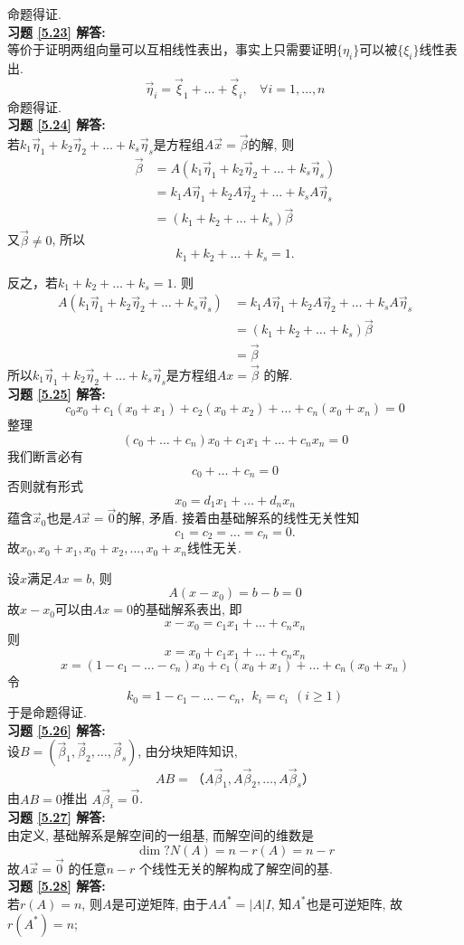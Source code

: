 \documentclass[a4paper]{book}
\begin{document}
命题得证.\\
\textbf{习题 \ref{5.23} 解答:}\\
等价于证明两组向量可以互相线性表出，事实上只需要证明$\{\eta_i \}$可以被$\{\xi_i \}$线性表出.
$$\vec{\eta}_i=\vec{\xi}_1+\dots+\vec{\xi}_i,\ \ \ \   \forall i=1,\dots,n$$
命题得证.\\
\textbf{习题 \ref{5.24} 解答:}\\
若$k_1 \vec{\eta}_1+k_2 \vec{\eta}_2+\dots+k_s  \vec{\eta}_s$是方程组$A\vec{x}=\vec{\beta}$的解, 则
\begin{displaymath}\begin{aligned}
\vec{\beta}&=A(k_1 \vec{\eta}_1+k_2 \vec{\eta}_2+\dots+k_s \vec{\eta}_s )\\&=k_1 A\vec{\eta}_1+k_2 A\vec{\eta}_2+\dots+k_s A\vec{\eta}_s\\&=(k_1+k_2+\dots+k_s )\vec{\beta}
\end{aligned}
\end{displaymath}
又$\vec{\beta}\not=0$, 所以$$k_1+k_2+\dots+k_s=1.$$

反之，若$k_1+k_2+\dots+k_s=1.$ 则
\begin{displaymath}\begin{aligned}
A(k_1 \vec{\eta}_1+k_2 \vec{\eta}_2+\dots+k_s \vec{\eta}_s )&=k_1 A\vec{\eta}_1+k_2 A\vec{\eta}_2+\dots+k_s A\vec{\eta}_s\\&=(k_1+k_2+\dots+k_s )\vec{\beta}\\&=\vec{\beta}
\end{aligned}
\end{displaymath}
所以$k_1 \vec{\eta}_1+k_2 \vec{\eta}_2+\dots+k_s \vec{\eta}_s$是方程组$Ax=\vec{\beta}$ 的解.\\
\textbf{习题 \ref{5.25} 解答:}\\
$$c_0 x_0+c_1 (x_0+x_1 )+c_2 (x_0+x_2 )+\dots+c_n (x_0+x_n )=0$$
整理
$$(c_0+\dots+c_n) x_0+c_1 x_1+\dots+c_n x_n=0$$
我们断言必有$$c_0+\dots+c_n=0$$
否则就有形式$$x_0=d_1 x_1+\dots+d_n x_n$$
蕴含$\vec{x}_0$也是$A\vec{x}=\vec{0}$的解, 矛盾. 接着由基础解系的线性无关性知$$c_1=c_2=\dots=c_n=0.$$
故$x_0,x_0+x_1,x_0+x_2,\dots,x_0+x_n$线性无关.

设$x$满足$Ax=b$, 则$$A(x-x_0)=b-b=0$$ 故$x-x_0$可以由$Ax=0$的基础解系表出, 即$$x-x_0=c_1 x_1+\dots+c_n x_n$$
则$$x=x_0+c_1 x_1+\dots+c_n x_n$$
$$x=(1-c_1-\dots-c_n ) x_0+c_1 (x_0+x_1 )+\dots+c_n (x_0+x_n )$$
令$$k_0=1-c_1-\dots-c_n,\ \ k_i=c_i\ \  (i≥1)$$
于是命题得证.\\
\textbf{习题 \ref{5.26} 解答:}\\
设$B=(\vec{\beta}_1,\vec{\beta}_2,\dots,\vec{\beta}_s)$, 由分块矩阵知识, $$AB=（A\vec{\beta}_1,A\vec{\beta}_2,\dots,A\vec{\beta}_s ）$$
由$AB=0$推出 $A\vec{\beta}_i=\vec{0}$.\\
\textbf{习题 \ref{5.27} 解答:}\\
由定义, 基础解系是解空间的一组基, 而解空间的维数是
\begin{displaymath}\dim ?N(A)=n-r(A)=n-r\end{displaymath}
故$A\vec{x}=\vec{0}$ 的任意$n-r$ 个线性无关的解构成了解空间的基.\\
\textbf{习题 \ref{5.28} 解答:}\\
 若$r(A)=n$, 则$A$是可逆矩阵, 由于$AA^{*}=|A|I$, 知$A^{*}$也是可逆矩阵, 故$r(A^{*})=n$;
\end{document}
